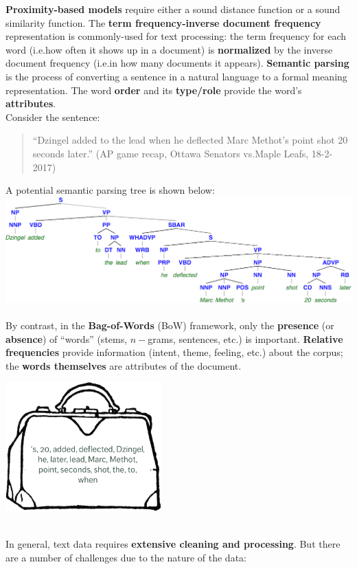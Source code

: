 \documentclass[20pt,landscape,footrule,headrule]{foils}
\newcommand{\newl}{\newline\newline}
\def\fh{\foilhead}
\begin{document}
{{\fh{Text Processing}
\noindent \textbf{Proximity-based models} require either a sound distance function or a sound similarity function. \newl The \textbf{term frequency-inverse document frequency} representation is commonly-used for text processing: the term frequency for each word (i.e.\@ how often it shows up in a document) is \textbf{normalized} by the inverse document frequency (i.e.\@ in how many documents it appears). \newl \textbf{Semantic parsing} is the process of converting a sentence in a natural language to a formal meaning representation.
\newl The word \textbf{order} and its \textbf{type/role} provide the word’s \textbf{attributes}.\newpage\ \\ \noindent 
Consider the sentence: 
\begin{quote}``Dzingel added to the lead when he deflected Marc Methot’s point shot 20 seconds later.'' (AP game recap, Ottawa Senators vs.\@Toronto Maple Leafs, 18-2-2017)
\end{quote}
A potential semantic parsing tree is shown below: \\ 
\includegraphics[width=\textwidth]{Images/SemanticParsing}
\newpage\ \\ \noindent By contrast, in the \textbf{Bag-of-Words} (BoW) framework, only the \textbf{presence} (or \textbf{absence}) of ``words'' (stems, $n-$grams, sentences, etc.) is important. 
\newl \textbf{Relative frequencies} provide information (intent, theme, feeling, etc.) about the corpus; the \textbf{words themselves} are attributes of the document. \begin{center}
\includegraphics[width=0.45\textwidth]{Images/BoW}\end{center}\newpage\ \\ \noindent In general, text data requires \textbf{extensive cleaning and processing}. But there are a number of challenges due to the nature of the data:
}}
\end{document}
